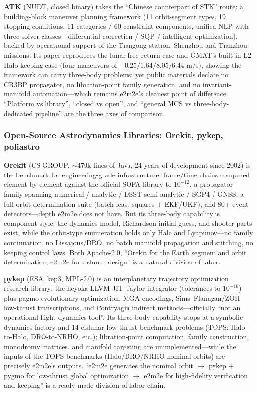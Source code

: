 \textbf{ATK} (NUDT, closed binary) takes the ``Chinese counterpart of STK''
route: a building-block maneuver planning framework (11 orbit-segment types,
19 stopping conditions, 11 categories / 60 constraint components, unified NLP
with three solver classes---differential correction / SQP / intelligent
optimization), backed by operational support of the Tiangong station, Shenzhou
and Tianzhou missions. Its paper reproduces the lunar free-return case and
GMAT's built-in L2 Halo keeping case (four maneuvers of
$-0.25/1.64/8.05/6.44$ m/s), showing the framework can carry three-body
problems; yet public materials declare no CR3BP propagator, no libration-point
family generation, and no invariant-manifold automation---which remains
e2m2e's cleanest point of difference. ``Platform vs library'', ``closed vs
open'', and ``general MCS vs three-body-dedicated pipeline'' are the three
axes of comparison.

\subsubsection{Open-Source Astrodynamics Libraries: Orekit, pykep, poliastro}

\textbf{Orekit} (CS GROUP, $\sim$470k lines of Java, 24 years of development
since 2002) is the benchmark for engineering-grade infrastructure:
frame/time chains compared element-by-element against the official SOFA
library to $10^{-12}$, a propagator family spanning numerical / analytic /
DSST semi-analytic / SGP4 / GNSS, a full orbit-determination suite (batch
least squares + EKF/UKF), and 80+ event detectors---depth e2m2e does not
have. But its three-body capability is component-style: the dynamics model,
Richardson initial guess, and shooter parts exist, while the orbit-type
enumeration holds only Halo and Lyapunov---no family continuation, no
Lissajous/DRO, no batch manifold propagation and stitching, no keeping
control laws. Both Apache-2.0, ``Orekit for the Earth segment and orbit
determination, e2m2e for cislunar design'' is a natural division of labor.

\textbf{pykep} (ESA, kep3, MPL-2.0) is an interplanetary trajectory
optimization research library: the heyoka LLVM-JIT Taylor integrator
(tolerances to $10^{-16}$) plus pagmo evolutionary optimization, MGA
encodings, Sims--Flanagan/ZOH low-thrust transcriptions, and Pontryagin
indirect methods---officially ``not an operational flight dynamics tool''.
Its three-body capability stops at a symbolic dynamics factory and 14
cislunar low-thrust benchmark problems (TOPS: Halo-to-Halo, DRO-to-NRHO,
etc.); libration-point computation, family construction, monodromy matrices,
and manifold targeting are unimplemented---while the inputs of the TOPS
benchmarks (Halo/DRO/NRHO nominal orbits) are precisely e2m2e's outputs.
``e2m2e generates the nominal orbit $\to$ pykep + pygmo for low-thrust
global optimization $\to$ e2m2e for high-fidelity verification and keeping''
is a ready-made division-of-labor chain.

